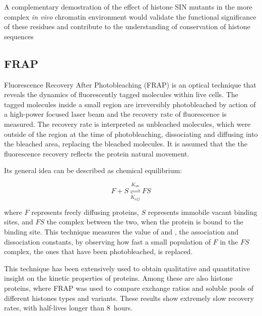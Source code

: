 	A complementary demostration of the effect of histone SIN mutants 
	in the more complex \textit{in vivo} chromatin environment would 
	validate the functional significance of these residues 
	and contribute to the understanding of conservation of histone sequences


  \subsection{FRAP}

    Fluorescence Recovery After Photobleaching (FRAP) is an optical technique
    that reveals the dynamics of fluorescently tagged molecules within live cells.
    The tagged molecules inside a small region are irreversibly photobleached by
    action of a high-power focused laser beam and the recovery rate of fluorescence
    is measured. The recovery rate is interpreted as unbleached molecules,
    which were outside of the region at the time of photobleaching, dissociating and
    diffusing into the bleached area, replacing the bleached molecules. It is assumed that the
    the fluorescence recovery reflects the protein natural movement.

    Its general idea can be described as chemical equilibrium:

    \begin{displaymath}
      F + S \overset{K_{on}}{\underset{K_{off}}{\rightleftharpoons}} FS
    \end{displaymath}

    where $F$ represents freely diffusing proteins, $S$ represents immobile vacant
    binding sites, and $FS$ the complex between the two, when the protein is bound
    to the binding site. This technique measures the value of \Kon{} and \Koff{},
    the association and dissociation constants, by observing how fast a
    small population of $F$ in the $FS$ complex, the ones that have been
    photobleached, is replaced.

    This technique has been extensively used to obtain qualitative and quantitative
    insight on the kinetic properties of proteins. Among these are also
    histone proteins, where FRAP was used to compare exchange ratios and
    soluble pools of different histones types and variants. These results
    show extremely slow recovery rates, with half-lives longer than 8~hours.


